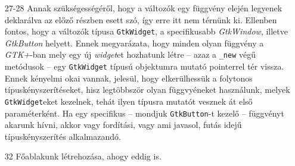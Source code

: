 \begin{enumerate}
 \item[27-28] Annak szükségességéről, hogy a változók egy függvény elején legyenek deklarálva az előző részben esett szó, így erre itt nem térnünk ki. Ellenben fontos, hogy a változók típusa \texttt{GtkWidget}, a specifikusabb \textit{GtkWindow}, illetve \textit{GtkButton} helyett. Ennek megyarázata, hogy minden olyan függvény a \textit{GTK+}-ban mely egy új \textit{widget}et hozhatunk létre -- azaz a \texttt{\_new} végű metódusok -- egy \texttt{GtkWidget} típusú objektumra mutató pointerrel tér vissza. Ennek kényelmi okai vannak, jelesül, hogy elkerülhessük a folytonos típuskényszerítéseket, hisz legtöbbször olyan függvyéneket használunk, melyek \texttt{GtkWidget}eket kezelnek, tehát ilyen típusra mutatót vesznek át első paraméterként. Ha egy specifikus -- mondjuk \texttt{GtkButton}-t kezelő -- függvényt akarunk hívni, akkor vagy fordítási, vagy ami javasol, futás idejű típuskényszerítés alkalmazandó.

 \item[32] Főablakunk létrehozása, ahogy eddig is.


\end{enumerate}
